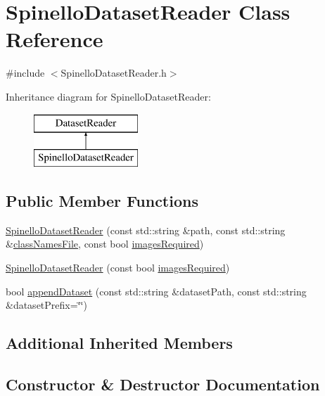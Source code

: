 \hypertarget{class_spinello_dataset_reader}{}\section{Spinello\+Dataset\+Reader Class Reference}
\label{class_spinello_dataset_reader}


{\ttfamily \#include $<$Spinello\+Dataset\+Reader.\+h$>$}

Inheritance diagram for Spinello\+Dataset\+Reader\+:\begin{figure}[H]
\begin{center}
\leavevmode
\includegraphics[height=2.000000cm]{class_spinello_dataset_reader}
\end{center}
\end{figure}
\subsection*{Public Member Functions}
\begin{DoxyCompactItemize}
\item 
\hyperlink{class_spinello_dataset_reader_a4ba79e9d888e4e23726b2f4d8c6d31db}{Spinello\+Dataset\+Reader} (const std\+::string \&path, const std\+::string \&\hyperlink{class_dataset_reader_a45ded43b56539f1e37a24ca9c94b4611}{class\+Names\+File}, const bool \hyperlink{class_dataset_reader_a71d04d25d58e0e9a0c05d69afcff03a1}{images\+Required})
\item 
\hyperlink{class_spinello_dataset_reader_a894804f5b2ea181ba0b3d1b85ee43cfa}{Spinello\+Dataset\+Reader} (const bool \hyperlink{class_dataset_reader_a71d04d25d58e0e9a0c05d69afcff03a1}{images\+Required})
\item 
bool \hyperlink{class_spinello_dataset_reader_a2313fdf01fb702337dda812f0c341cd9}{append\+Dataset} (const std\+::string \&dataset\+Path, const std\+::string \&dataset\+Prefix=\char`\"{}\char`\"{})
\end{DoxyCompactItemize}
\subsection*{Additional Inherited Members}


\subsection{Constructor \& Destructor Documentation}
\mbox{\label{class_spinello_dataset_reader_a4ba79e9d888e4e23726b2f4d8c6d31db}} 
